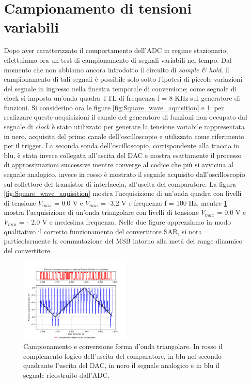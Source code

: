 \documentclass[journal]{IEEEtran}
\begin{document}
\section{Campionamento di tensioni variabili}
Dopo aver caratterizzato il comportamento dell'ADC in regime stazionario, effettuiamo ora un test di campionamento di segnali variabili nel tempo. Dal momento che non abbiamo ancora introdotto il circuito di \textit{sample \& hold}, il campionamento di tali segnali è possibile solo sotto l'ipotesi di piccole variazioni del segnale in ingresso nella finestra temporale di conversione; come segnale di clock si imposta un'onda quadra TTL di frequenza f = 8 KHz sul generatore di funzioni. Si considerino ora le figure \ref{fig:Square_wave_aquisition} e \ref{fig:Triangular_wave_aquisition}: per realizzare queste acquisizioni il canale del generatore di funzioni non occupato dal segnale di \textit{clock} è stato utilizzato per generare la tensione variabile rappresentata in nero, acquisita del primo canale dell'oscilloscopio e utilizzata come riferimento per il trigger. La seconda sonda dell'oscilloscopio, corrispondente alla traccia in blu, è stata invece collegata all'uscita del DAC e mostra esattamente il processo di approssimazioni successive mentre converge al codice che più si avvicina al segnale analogico, invece in rosso è mostrato il segnale acquisito dall'oscilloscopio sul collettore del transistor di interfaccia, all'uscita del comparatore. La figura \ref{fig:Square_wave_aquisition} mostra l'acquisizione di un'onda quadra con livelli di tensione $V_{max}$ = 0.0 V e $V_{min}$ = -3.2 V e frequenza f = 100 Hz, mentre \ref{fig:Triangular_wave_aquisition} mostra l'acquisizione di un'onda triangolare con livelli di tensione $V_{max}$ = 0.0 V e $V_{min}$ = - 2.0 V e medesima frequenza. Nelle due figure apprezziamo in modo qualitativo il corretto funzionamento del convertitore SAR, si nota particolarmente la commutazione del MSB intorno alla metà del range dinamico del convertitore.


\begin{figure}[H]%
\begin{center}
\includegraphics[trim = {0 25 0 0},clip, width=0.50\textwidth]{analysis/output/triangle_wave_aq.pdf}
\caption{Campionamento e conversione forma d'onda triangolare. In rosso il complemento logico dell'uscita del comparatore, in blu nel secondo quadrante l'uscita del DAC, in nero il segnale analogico e in blu il segnale ricostruito dall'ADC.}
\label{fig:Triangular_wave_aquisition}
\end{center}
\end{figure}
\end{document}
